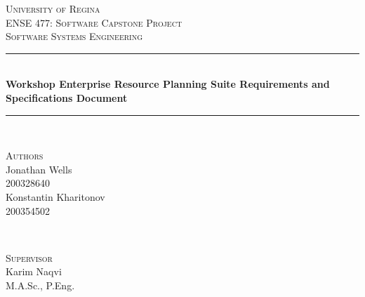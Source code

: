 \begin{titlepage} %
	\newcommand{\HRule}{\rule{\linewidth}{0.5mm}} %
	
	\center %
	
	
	\textsc{\Huge University of Regina}\\[1.5cm] %

	\textsc{\Large ENSE 477: Software Capstone Project}\\[0.5cm]
	
	\textsc{\Large Software Systems Engineering}\\[0.5cm] %
	
	
	
	
	
	\HRule\\[0.4cm]
	
	{\Huge\bfseries Workshop Enterprise Resource Planning Suite Requirements and Specifications Document}\\[0.4cm] %
	
	\HRule\\[1.5cm]
	
	
	\begin{minipage}[t]{0.4\textwidth}
		\begin{flushleft}
			\large
			\textsc{Authors}\\
			Jonathan Wells\\
			\textsc{200328640}\\ %
			\large
			Konstantin Kharitonov\\
			\textsc{200354502} %
		\end{flushleft}
		
	\end{minipage}
	~
	\begin{minipage}[t]{0.4\textwidth}
		\begin{flushright}
			\large
			\textsc{Supervisor}\\ %
			Karim Naqvi\\
			M.A.Sc., P.Eng.\\
		\end{flushright}
	\end{minipage}
	

\end{titlepage}

